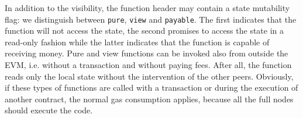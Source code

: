 In addition to the visibility, the function header may contain a state
mutability flag: we distinguish between \texttt{pure}, \texttt{view} and 
\texttt{payable}. The first indicates that the function will not access the
state, the second promises to access the state in a read-only fashion while the 
latter indicates that the function is capable of receiving money.
Pure and view functions can be invoked also from outside the EVM, i.e. without
a transaction and without paying fees. After all, the function reads only the
local state without the intervention of the other peers.
Obviously, if these types of functions are called with a transaction or during
the execution of another contract, the normal gas consumption applies, because
all the full nodes should execute the code.




